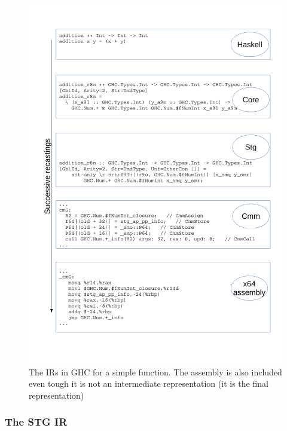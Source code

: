 \begin{figure}
\begin{mdframed}
  \centering
  \includegraphics[width=5.5in]{fig/recastings}
  \caption{The IRs in GHC for a simple function. The assembly is also
  included even tough it is not an intermediate representation (it is
  the final representation)}\label{fig:recastings}
\end{mdframed}
\end{figure}

\subsubsection{The STG IR}

